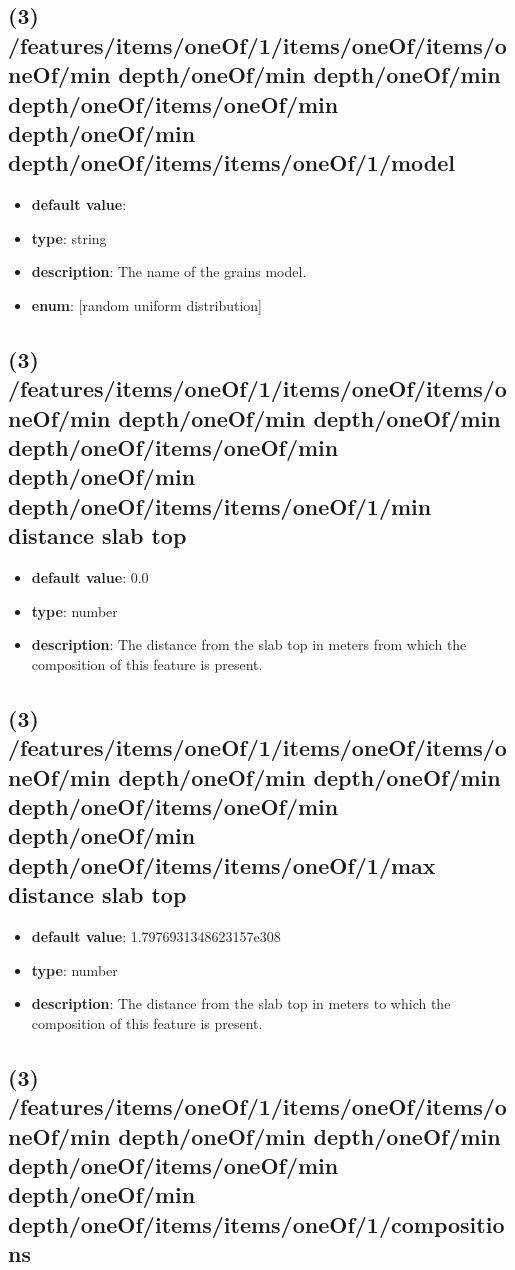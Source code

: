 \subsection{(3) /features/items/oneOf/1/items/oneOf/items/oneOf/min depth/oneOf/min depth/oneOf/min depth/oneOf/items/oneOf/min depth/oneOf/min depth/oneOf/items/items/oneOf/1/model}
\begin{itemize}[leftmargin=3em]\item {\bf default value}: 
\item {\bf type}: string
\item {\bf description}: The name of the grains model.
\item {\bf enum}: [random uniform distribution]\end{itemize}\subsection{(3) /features/items/oneOf/1/items/oneOf/items/oneOf/min depth/oneOf/min depth/oneOf/min depth/oneOf/items/oneOf/min depth/oneOf/min depth/oneOf/items/items/oneOf/1/min distance slab top}
\begin{itemize}[leftmargin=3em]\item {\bf default value}: 0.0
\item {\bf type}: number
\item {\bf description}: The distance from the slab top in meters from which the composition of this feature is present.
\end{itemize}\subsection{(3) /features/items/oneOf/1/items/oneOf/items/oneOf/min depth/oneOf/min depth/oneOf/min depth/oneOf/items/oneOf/min depth/oneOf/min depth/oneOf/items/items/oneOf/1/max distance slab top}
\begin{itemize}[leftmargin=3em]\item {\bf default value}: 1.7976931348623157e308
\item {\bf type}: number
\item {\bf description}: The distance from the slab top in meters to which the composition of this feature is present.
\end{itemize}\subsection{(3) /features/items/oneOf/1/items/oneOf/items/oneOf/min depth/oneOf/min depth/oneOf/min depth/oneOf/items/oneOf/min depth/oneOf/min depth/oneOf/items/items/oneOf/1/compositions}
